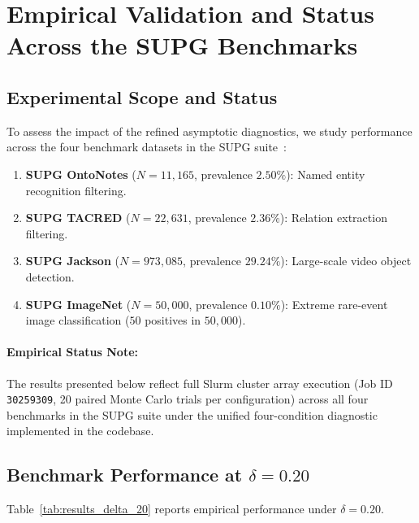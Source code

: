 \documentclass[11pt,a4paper]{article}
\begin{document}
\newpage
\section{Empirical Validation and Status Across the SUPG Benchmarks}

\subsection{Experimental Scope and Status}
To assess the impact of the refined asymptotic diagnostics, we study performance across the four benchmark datasets in the SUPG suite~\cite{kang2020approximate}:
\begin{enumerate}[leftmargin=*]
    \item \textbf{SUPG OntoNotes} ($N = 11,165$, prevalence $2.50\%$): Named entity recognition filtering.
    \item \textbf{SUPG TACRED} ($N = 22,631$, prevalence $2.36\%$): Relation extraction filtering.
    \item \textbf{SUPG Jackson} ($N = 973,085$, prevalence $29.24\%$): Large-scale video object detection.
    \item \textbf{SUPG ImageNet} ($N = 50,000$, prevalence $0.10\%$): Extreme rare-event image classification ($50$ positives in $50,000$).
\end{enumerate}

\paragraph{Empirical Status Note:} The results presented below reflect full Slurm cluster array execution (Job ID \texttt{30259309}, 20 paired Monte Carlo trials per configuration) across all four benchmarks in the SUPG suite under the unified four-condition diagnostic implemented in the codebase.

\subsection{Benchmark Performance at $\delta = 0.20$}
Table~\ref{tab:results_delta_20} reports empirical performance under $\delta = 0.20$.
\end{document}
